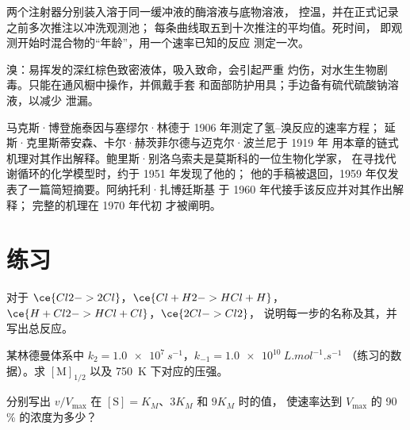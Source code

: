 \begin{inthelab}[停流法测量]
两个注射器分别装入溶于同一缓冲液的酶溶液与底物溶液，
控温，并在正式记录之前多次推注以冲洗观测池；
每条曲线取五到十次推注的平均值。死时间，
即观测开始时混合物的“年龄”，用一个速率已知的反应
测定一次。
\end{inthelab}

\begin{safety}{}
溴：易挥发的深红棕色致密液体，吸入致命，会引起严重
灼伤，对水生生物剧毒。只能在通风橱中操作，并佩戴手套
和面部防护用具；手边备有硫代硫酸钠溶液，以减少
泄漏。
\end{safety}

\begin{history}[博登施泰因与别洛乌索夫]
马克斯·博登施泰因与塞缪尔·林德于 1906 年测定了氢–溴反应的速率方程；
延斯·克里斯蒂安森、卡尔·赫茨菲尔德与迈克尔·波兰尼于 1919 年
用本章的链式机理对其作出解释。鲍里斯·别洛乌索夫是莫斯科的一位生物化学家，
在寻找代谢循环的化学模型时，约于 1951 年发现了他的；
他的手稿被退回，1959 年仅发表了一篇简短摘要。阿纳托利·扎博廷斯基
于 1960 年代接手该反应并对其作出解释；
完整的机理在 1970 年代初
才被阐明。
\end{history}

\section{练习}

\begin{exercise}[$\star$]\label{exo:b3:complex-kinetics:1}
对于 $\ce{Cl2 -> 2 Cl}$，$\ce{Cl + H2 -> HCl + H}$，$\ce{H + Cl2 -> HCl + Cl}$，$\ce{2 Cl -> Cl2}$，
说明每一步的名称及其，并写出总反应。
\end{exercise}

\begin{exercise}[$\star$]\label{exo:b3:complex-kinetics:2}
某林德曼体系中 $k_2 = \qty{1.0e7}{s^{-1}}$，$k_{-1} = \qty{1.0e10}{L.mol^{-1}.s^{-1}}$
（练习的数据）。求 $[\mathrm M]_{1/2}$ 以及 \qty{750}{K} 下对应的压强。
\end{exercise}

\begin{exercise}[$\star$]\label{exo:b3:complex-kinetics:3}
分别写出 $v/V_{\max}$ 在 $[\mathrm S] = K_M$、$3K_M$ 和 $9K_M$ 时的值，
使速率达到 $V_{\max}$ 的 90\,\% 的浓度为多少？
\end{exercise}

